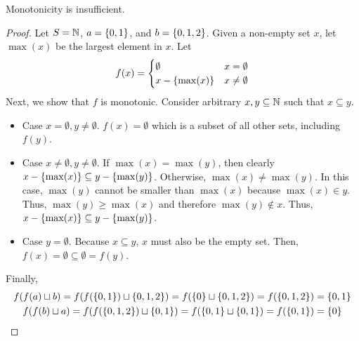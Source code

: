 \documentclass{mwhittaker}
\newcommand{\join}{\sqcup}
\begin{document}
\begin{claim}
  Monotonicity is insufficient.
\end{claim}
\begin{proof}
  Let $S = \mathbb{N}$, $a = \{0, 1\}$, and $b = \{0, 1, 2\}$. Given a
  non-empty set $x$, let $\max(x)$ be the largest element in $x$. Let \[
    f(x) = \begin{cases}
      \emptyset & x = \emptyset \\
      x - \{\max(x)\} & x \neq \emptyset
    \end{cases}
  \]
  Next, we show that $f$ is monotonic. Consider arbitrary $x, y \subseteq
  \mathbb{N}$ such that $x \subseteq y$.
  \begin{itemize}
    \item Case $x = \emptyset, y \neq \emptyset$.
      $f(x) = \emptyset$ which is a subset of all other sets, including
      $f(y)$.

    \item Case $x \neq \emptyset, y \neq \emptyset$.
      If $\max(x) = \max(y)$, then clearly $x - \{\max(x)\} \subseteq y -
      \{\max(y)\}$. Otherwise, $\max(x) \neq \max(y)$. In this case,
      $\max(y)$ cannot be smaller than $\max(x)$ because $\max(x) \in y$.
      Thus, $\max(y) \geq \max(x)$ and therefore $\max(y) \notin x$. Thus, $x
      - \{\max(x)\} \subseteq y - \{\max(y)\}$.

    \item Case $y = \emptyset$.
      Because $x \subseteq y$, $x$ must also be the empty set. Then, $f(x) =
      \emptyset \subseteq \emptyset = f(y)$.
  \end{itemize}
  Finally,
  \begin{gather*}
    f(f(a) \join b)
      = f(f(\set{0, 1}) \join \set{0, 1, 2})
      = f(\set{0} \join \set{0, 1, 2})
      = f(\set{0, 1, 2})
      = \set{0, 1} \\
      f(f(b) \join a)
      = f(f(\set{0, 1, 2}) \join \set{0, 1})
      = f(\set{0, 1} \join \set{0, 1})
      = f(\set{0, 1})
      = \set{0}
  \end{gather*}
\end{proof}
\end{document}
